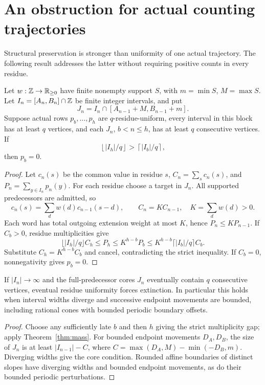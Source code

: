 \section{An obstruction for actual counting trajectories}
Structural preservation is stronger than uniformity of one actual trajectory. The following result addresses the latter without requiring positive counts in every residue.
\begin{theorem}\label{thm:mass}
Let $w:\mathbb Z\to\mathbb R_{\ge0}$ have finite nonempty support $S$, with $m=\min S$, $M=\max S$. Let $I_n=[A_n,B_n]\cap\mathbb Z$ be finite integer intervals, and put
\[
J_n=I_n\cap[A_{n-1}+M,B_{n-1}+m].
\]
Suppose actual rows $p_b,\ldots,p_h$ are $q$-residue-uniform, every interval in this block has at least $q$ vertices, and each $J_n$, $b<n\le h$, has at least $q$ consecutive vertices. If
\[
\left\lfloor |I_h|/q\right\rfloor>\left\lceil |I_b|/q\right\rceil,
\]
then $p_b=0$.
\end{theorem}
\begin{proof}
Let $c_n(s)$ be the common value in residue $s$, $C_n=\sum_s c_n(s)$, and $P_n=\sum_{y\in I_n}p_n(y)$. For each residue choose a target in $J_n$. All supported predecessors are admitted, so
\[
c_n(s)=\sum_d w(d)c_{n-1}(s-d),\qquad C_n=K C_{n-1},\quad K=\sum_d w(d)>0.
\]
Each word has total outgoing extension weight at most $K$, hence $P_n\le K P_{n-1}$. If $C_b>0$, residue multiplicities give
\[
\lfloor |I_h|/q\rfloor C_h\le P_h\le K^{h-b}P_b
\le K^{h-b}\lceil |I_b|/q\rceil C_b.
\]
Substitute $C_h=K^{h-b}C_b$ and cancel, contradicting the strict inequality. If $C_b=0$, nonnegativity gives $p_b=0$.
\end{proof}

\begin{proposition}\label{prop:cones}
If $|I_n|\to\infty$ and the full-predecessor cores $J_n$ eventually contain $q$ consecutive vertices, eventual residue uniformity forces extinction. In particular this holds when interval widths diverge and successive endpoint movements are bounded, including rational cones with bounded periodic boundary offsets.
\end{proposition}
\begin{proof}
Choose any sufficiently late $b$ and then $h$ giving the strict multiplicity gap; apply Theorem~\ref{thm:mass}. For bounded endpoint movements $D_A,D_B$, the size of $J_n$ is at least $|I_{n-1}|-C$, where $C=\max(D_A,M)-\min(-D_B,m)$. Diverging widths give the core condition. Rounded affine boundaries of distinct slopes have diverging widths and bounded endpoint movements, as do their bounded periodic perturbations.
\end{proof}

